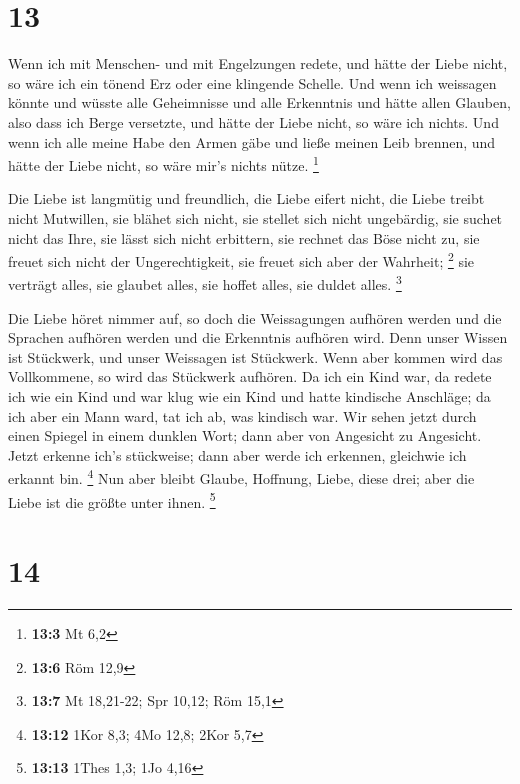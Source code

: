 \hypertarget{section-7}{%
\section{13}\label{section-7}}

 Wenn ich mit Menschen- und mit Engelzungen redete, und
hätte der Liebe nicht, so wäre ich ein tönend Erz oder eine klingende
Schelle.  Und wenn ich weissagen könnte und wüsste alle
Geheimnisse und alle Erkenntnis und hätte allen Glauben, also dass ich
Berge versetzte, und hätte der Liebe nicht, so wäre ich nichts.
 Und wenn ich alle meine Habe den Armen gäbe und ließe
meinen Leib brennen, und hätte der Liebe nicht, so wäre mir's nichts
nütze. \footnote{\textbf{13:3} Mt 6,2}

 Die Liebe ist langmütig und freundlich, die Liebe eifert
nicht, die Liebe treibt nicht Mutwillen, sie blähet sich nicht,
 sie stellet sich nicht ungebärdig, sie suchet nicht das
Ihre, sie lässt sich nicht erbittern, sie rechnet das Böse nicht zu,
 sie freuet sich nicht der Ungerechtigkeit, sie freuet sich
aber der Wahrheit; \footnote{\textbf{13:6} Röm 12,9}  sie
verträgt alles, sie glaubet alles, sie hoffet alles, sie duldet alles.
\footnote{\textbf{13:7} Mt 18,21-22; Spr 10,12; Röm 15,1}

 Die Liebe höret nimmer auf, so doch die Weissagungen
aufhören werden und die Sprachen aufhören werden und die Erkenntnis
aufhören wird.  Denn unser Wissen ist Stückwerk, und unser
Weissagen ist Stückwerk.  Wenn aber kommen wird das
Vollkommene, so wird das Stückwerk aufhören.  Da ich ein
Kind war, da redete ich wie ein Kind und war klug wie ein Kind und hatte
kindische Anschläge; da ich aber ein Mann ward, tat ich ab, was kindisch
war.  Wir sehen jetzt durch einen Spiegel in einem dunklen
Wort; dann aber von Angesicht zu Angesicht. Jetzt erkenne ich's
stückweise; dann aber werde ich erkennen, gleichwie ich erkannt bin.
\footnote{\textbf{13:12} 1Kor 8,3; 4Mo 12,8; 2Kor 5,7}  Nun
aber bleibt Glaube, Hoffnung, Liebe, diese drei; aber die Liebe ist die
größte unter ihnen. \footnote{\textbf{13:13} 1Thes 1,3; 1Jo 4,16}

\hypertarget{section-8}{%
\section{14}\label{section-8}}

